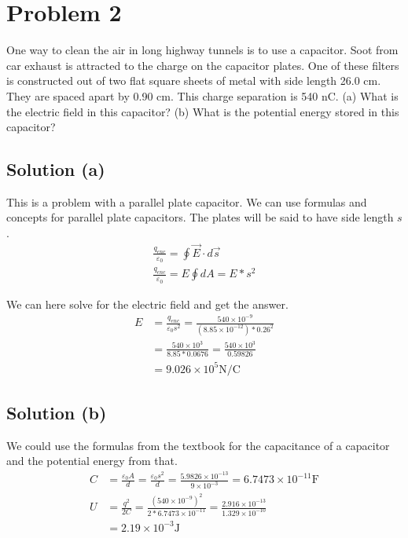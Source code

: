 \documentclass[12pt]{article}
\begin{document}
\pagebreak
\section*{Problem 2}
One way to clean the air in long highway tunnels is to use a capacitor. 
Soot from car exhaust is attracted to the charge on the capacitor plates. 
One of these filters is constructed out of two flat square sheets of metal with side length 26.0 cm. They are spaced apart by 0.90 cm. This charge separation is 540 nC. 
(a) What is the electric field in this capacitor? 
(b) What is the potential energy stored in this capacitor?

\subsection*{Solution (a)}
This is a problem with a parallel plate capacitor.
We can use formulas and concepts for parallel plate capacitors.
The plates will be said to have side length $s$.
\begin{gather*}
    \frac{q_{enc}}{\varepsilon_0} = \oint \vec{E} \cdot d\vec{s}\\
    \frac{q_{enc}}{\varepsilon_0} = E \oint dA = E * s^2
\end{gather*}

We can here solve for the electric field and get the answer.
\begin{align*}
    E   &=  \frac{q_{enc}}{\varepsilon_0 s^2} 
        =   \frac{540 \times 10^{-9}}{(8.85 \times 10^{-12})*0.26^2}\\
        &=  \frac{540 \times 10^3}{8.85 * 0.0676}
        =   \frac{540 \times 10^3}{0.59826}\\
        &=  \boxed{9.026 \times 10^5 \unit{\newton/\coulomb}}
\end{align*}

\subsection*{Solution (b)}
We could use the formulas from the textbook for the capacitance of a capacitor and the potential energy from that.
\begin{align*}
    C   &=  \frac{\varepsilon_0 A}{d}
        =   \frac{\varepsilon_0 s^2}{d}
        =   \frac{5.9826 \times 10^{-13}}{9 \times 10^{-3}}
        =   6.7473 \times 10^{-11} \unit{\farad}\\
    U   &=  \frac{q^2}{2C}
        =   \frac{(540 \times 10^{-9})^2}{2 * 6.7473 \times 10^{-11}}
        =   \frac{2.916 \times 10^{-13}}{1.329 \times 10^{-10}}\\
        &=  \boxed{2.19 \times 10^{-3} \unit{\joule}}
\end{align*}
\end{document}
